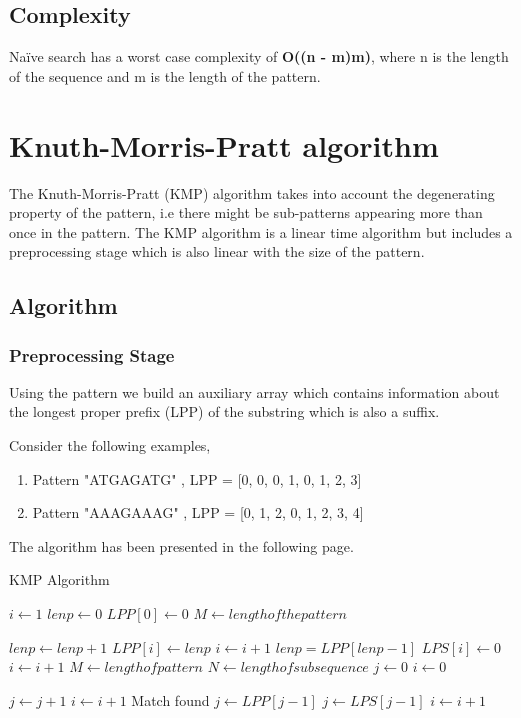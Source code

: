 \documentclass{article}
\begin{document}
\subsection{Complexity}
Na\"ive search has a worst case complexity of \textbf{O((n - m)m)}, where n is the length of the sequence and m is the length of the pattern.

\section{Knuth-Morris-Pratt algorithm}

The Knuth-Morris-Pratt (KMP) algorithm takes into account the degenerating property of the pattern, i.e there might be sub-patterns appearing more than once in the pattern. The KMP algorithm is a linear time algorithm but includes a preprocessing stage which is also linear with the size of the pattern.

\subsection{Algorithm}
\subsubsection{Preprocessing Stage}
Using the pattern we build an auxiliary array which contains information about the longest proper prefix (LPP) of the substring which is also a suffix.

Consider the following examples,
\begin{enumerate}[itemsep=0.1\baselineskip]
	\item Pattern "ATGAGATG" , LPP = [0, 0, 0, 1, 0, 1, 2, 3]
	\item Pattern "AAAGAAAG" , LPP = [0, 1, 2, 0, 1, 2, 3, 4]
\end{enumerate}

The algorithm has been presented in the following page.
\begin{algorithm}
\caption{KMP Algorithm}\label{euclid}
\begin{algorithmic}[1]
\State $i \gets 1$
\State $lenp \gets 0$
\State $LPP[0] \gets 0$
\State $M \gets length of the pattern$

		\State $lenp \gets lenp + 1$
		\State $LPP[i] \gets lenp$
		\State $i \gets i + 1$
	\Else
			\State $lenp = LPP[lenp - 1]$
		\Else
			\State $LPS[i] \gets 0$
			\State $i \gets i + 1$
		\EndIf
	\EndIf
\EndWhile
\EndProcedure
{}
\State $M \gets length of pattern$
\State $N \gets length of subsequence$
\State $j \gets 0$
\State $i \gets 0$

		\State $j \gets j + 1$
		\State $i \gets i + 1$
	\EndIf	
		\State Match found
		\State $j \gets LPP[j-1]$
	\Else
			\State $j \gets LPS[j-1]$
			\State $i \gets i + 1$
		\EndIf
	\EndIf
\EndWhile
\EndProcedure
\end{algorithmic}
\end{algorithm}
\clearpage
\end{document}
